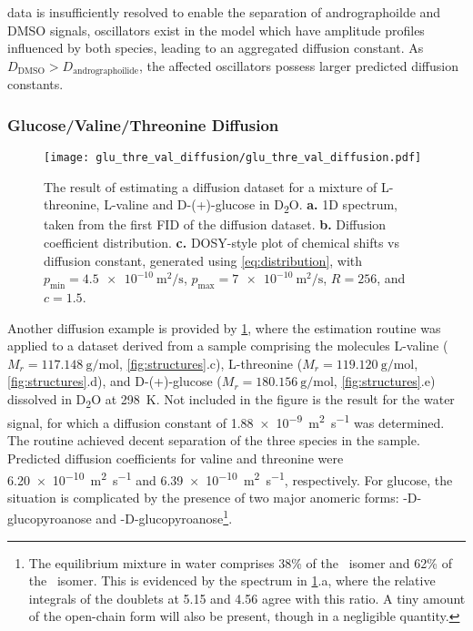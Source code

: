data is insufficiently resolved to enable the separation of andrographoilde and
\acs{DMSO} signals, oscillators exist in the model which have amplitude profiles
influenced by both species, leading to an aggregated diffusion constant. As
$D_{\text{DMSO}} > D_{\text{andrographoilide}}$, the affected oscillators
possess larger predicted diffusion constants.

\subsubsection{Glucose/Valine/Threonine Diffusion}
\begin{figure}
    \centering
    \texttt{[image: glu\_thre\_val\_diffusion/glu\_thre\_val\_diffusion.pdf]}
    \caption[
        The result of estimating a diffusion dataset for a mixture of L-threonine,
        L-valine and D-(+)-glucose.
    ]{
        The result of estimating a diffusion dataset for a mixture of L-threonine,
        L-valine and D-(+)-glucose in D\textsubscript{2}O.
        \textbf{a.} \acs{1D} spectrum, taken from the first \acs{FID} of the
        diffusion dataset.
        \textbf{b.} Diffusion coefficient distribution.
        \textbf{c.} \acs{DOSY}-style plot of chemical shifts vs diffusion
        constant, generated using \cref{eq:distribution}, with
        $p_{\text{min}} = \qty{4.5e-10}{\meter\squared\per\second}$,
        $p_{\text{max}} = \qty{7e-10}{\meter\squared\per\second}$,
        $R=256$, and $c=1.5$.
    }
    \label{fig:gluc_val_thre}
\end{figure}
Another diffusion example is provided by \cref{fig:gluc_val_thre}, where the
estimation routine was applied to a dataset derived from a sample comprising
the molecules L-valine ($M_r = \qty{117.148}{\gram\per\mole}$,
\cref{fig:structures}.c), L-threonine
($M_r = \qty{119.120}{\gram\per\mole}$, \cref{fig:structures}.d), and D-(+)-glucose ($M_r =
\qty{180.156}{\gram\per\mole}$, \cref{fig:structures}.e) dissolved in
D\textsubscript{2}O at \qty{298}{\kelvin}. Not included in the figure is the
result for the water signal, for which a diffusion constant of
\qty{1.88e-9}{\meter\squared\per\second} was determined. The routine
achieved decent separation of the three species in the sample. Predicted
diffusion coefficients for valine and threonine were
\qty{6.20e-10}{\meter\squared\per\second} and
\qty{6.39e-10}{\meter\squared\per\second}, respectively. For glucose, the situation is
complicated by the presence of two major anomeric forms:
\textalpha-D-glucopyroanose and
\textbeta-D-glucopyroanose\footnote{
    The equilibrium mixture in water comprises 38\% of the \textalpha\ isomer
    and 62\% of the \textbeta\ isomer.
    This is evidenced by the
    spectrum in \cref{fig:gluc_val_thre}.a, where the relative integrals of
    the doublets at \qty{5.15}{\partspermillion} and
    \qty{4.56}{\partspermillion} agree with this ratio.
    A tiny amount of the open-chain form will
    also be present, though in a negligible quantity.
}\cite[Chapter 3]{Davis2002}.

